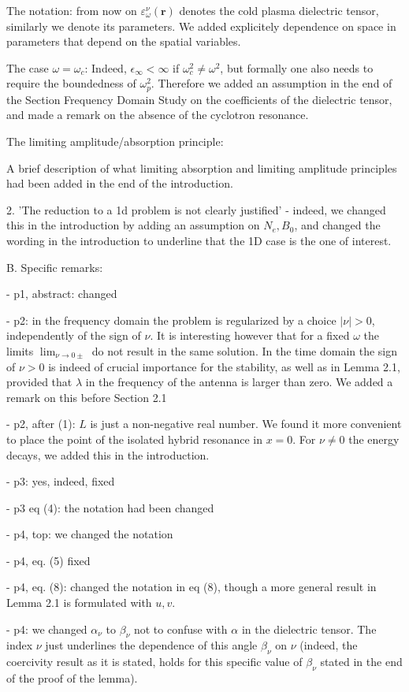 \documentclass[a4paper,10pt]{article}
\begin{document}
The notation: 
from now on $\varepsilon^{\nu}_{\omega}(\mathbf{r})$ denotes the cold plasma dielectric tensor, similarly we denote its parameters. 
We added explicitely dependence on space in parameters that depend on the spatial variables. 

The case $\omega=\omega_c$:
Indeed, $\epsilon_{\infty}<\infty$ if $\omega_c^2\neq \omega^2$, but formally one also needs to require the boundedness of $\omega_p^2$. Therefore we 
added an assumption in the end of the Section Frequency Domain Study on the coefficients of the dielectric tensor, and made a remark on the absence
of the cyclotron resonance. 


The limiting amplitude/absorption principle: 

A brief description of what limiting absorption and limiting amplitude principles had been added in the end of the introduction.

2. 'The reduction to a 1d problem is not clearly justified' - indeed, we changed this in the introduction by adding an assumption on $N_e, B_0$, 
and changed the wording in the introduction to underline that the 1D case is the one of interest. 


B. Specific remarks: 

- p1, abstract: changed

- p2: in the frequency domain  the problem is regularized by a choice $|\nu|>0$, independently of the sign of $\nu$. 
It is interesting however that for a fixed $\omega$ the limits $\lim_{\nu\rightarrow 0\pm}$ do not result in the same solution. 
In the time domain the sign of $\nu>0$ is indeed of crucial importance for the stability, as well as in Lemma 2.1, provided that $\lambda$ in the 
frequency of the antenna is larger than zero. We added a remark on this before Section 2.1  

- p2, after (1): $L$ is just a non-negative real number. We found it more convenient to place the point of the isolated hybrid resonance in $x=0$.
For $\nu\neq 0$ the energy decays, we added this in the introduction.


- p3: yes, indeed, fixed

- p3 eq (4): the notation had been changed
  
- p4, top: we changed the notation 

- p4, eq. (5) fixed

- p4, eq. (8): changed the notation in eq (8), though a more general result in Lemma 2.1 is formulated with $u,v$. 

- p4: we changed $\alpha_{\nu}$ to $\beta_{\nu}$ not to confuse with $\alpha$ in the dielectric tensor. The index $\nu$ 
just underlines the dependence of this angle $\beta_{\nu}$ on $\nu$ (indeed, the coercivity result as it is stated, holds for this specific value of $\beta_{\nu}$ stated 
in the end of the proof of the lemma).
\end{document}
